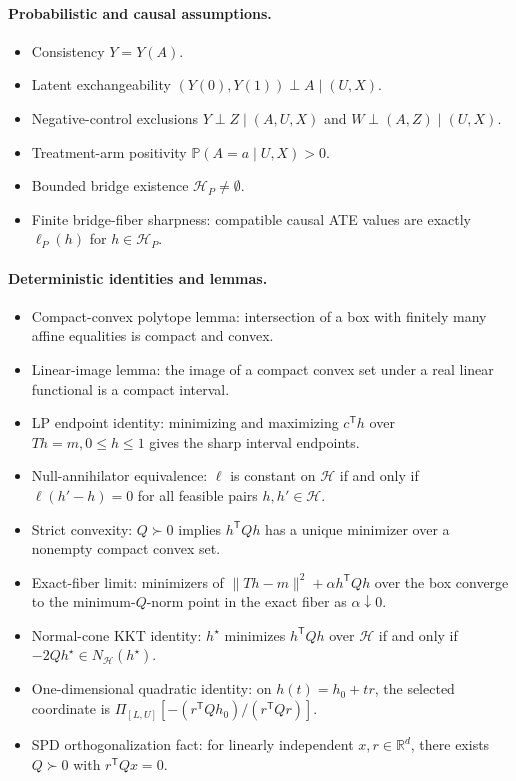 \documentclass[11pt]{article}
\renewcommand{\Pr}{\mathbb{P}}
\newcommand{\transpose}{\mathsf{T}}
\newcommand{\calH}{\mathcal{H}}
\newcommand{\R}{\mathbb{R}}
\theoremstyle{definition}
\theoremstyle{plain}
\theoremstyle{remark}
\begin{document}
\paragraph{Probabilistic and causal assumptions.}
\begin{itemize}[leftmargin=*]
\item Consistency \(Y=Y(A)\).
\item Latent exchangeability \((Y(0),Y(1))\perp A\mid(U,X)\).
\item Negative-control exclusions \(Y\perp Z\mid(A,U,X)\) and
\(W\perp(A,Z)\mid(U,X)\).
\item Treatment-arm positivity \(\Pr(A=a\mid U,X)>0\).
\item Bounded bridge existence \(\calH_P\neq\emptyset\).
\item Finite bridge-fiber sharpness: compatible causal ATE values are
exactly \(\ell_P(h)\) for \(h\in\calH_P\).
\end{itemize}

\paragraph{Deterministic identities and lemmas.}
\begin{itemize}[leftmargin=*]
\item Compact-convex polytope lemma: intersection of a box with finitely
many affine equalities is compact and convex.
\item Linear-image lemma: the image of a compact convex set under a real
linear functional is a compact interval.
\item LP endpoint identity: minimizing and maximizing \(c^\transpose h\)
over \(T h=m,0\le h\le1\) gives the sharp interval endpoints.
\item Null-annihilator equivalence:
\(\ell\) is constant on \(\calH\) if and only if
\(\ell(h'-h)=0\) for all feasible pairs \(h,h'\in\calH\).
\item Strict convexity: \(Q\succ0\) implies \(h^\transpose Qh\) has a unique
minimizer over a nonempty compact convex set.
\item Exact-fiber limit: minimizers of
\(\|Th-m\|^2+\alpha h^\transpose Qh\) over the box converge to the
minimum-\(Q\)-norm point in the exact fiber as \(\alpha\downarrow0\).
\item Normal-cone KKT identity:
\(h^\star\) minimizes \(h^\transpose Qh\) over \(\calH\) if and only if
\(-2Qh^\star\in N_{\calH}(h^\star)\).
\item One-dimensional quadratic identity:
on \(h(t)=h_0+tr\), the selected coordinate is
\(\Pi_{[L,U]}[-(r^\transpose Qh_0)/(r^\transpose Qr)]\).
\item SPD orthogonalization fact: for linearly independent \(x,r\in\R^d\),
there exists \(Q\succ0\) with \(r^\transpose Qx=0\).
\end{itemize}
\end{document}

